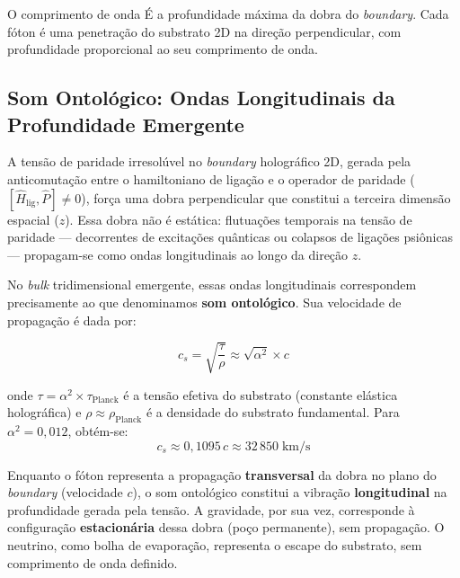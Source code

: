 \documentclass[12pt,a4paper,twoside]{article}
\newcommand{\alphaii}{\alpha^{2}}
\newcommand{\boundary}{\textit{boundary}}
\newcommand{\bulk}{\textit{bulk}}
\begin{document}
\noindent O comprimento de onda \'E a profundidade m\'axima da dobra do \boundary. Cada f\'oton \'e uma penetra\c{c}\~ao do substrato 2D na dire\c{c}\~ao perpendicular, com profundidade proporcional ao seu comprimento de onda.

\subsection{Som Ontol\'ogico: Ondas Longitudinais da Profundidade Emergente}

A tens\~ao de paridade irresol\'uvel no \boundary{} hologr\'afico 2D, gerada pela anticomuta\c{c}\~ao entre o hamiltoniano de liga\c{c}\~ao e o operador de paridade ($[\hat{H}_{\text{lig}}, \hat{P}] \neq 0$), for\c{c}a uma dobra perpendicular que constitui a terceira dimens\~ao espacial ($z$). Essa dobra n\~ao \'e est\'atica: flutua\c{c}\~oes temporais na tens\~ao de paridade --- decorrentes de excita\c{c}\~oes qu\^anticas ou colapsos de liga\c{c}\~oes psi\^onicas --- propagam-se como ondas longitudinais ao longo da dire\c{c}\~ao $z$.

No \bulk{} tridimensional emergente, essas ondas longitudinais correspondem precisamente ao que denominamos \textbf{som ontol\'ogico}. Sua velocidade de propaga\c{c}\~ao \'e dada por:
\begin{equationbox}[title={Velocidade do Som Ontol\'ogico}]
\begin{equation}
c_s = \sqrt{\frac{\tau}{\rho}} \approx \sqrt{\alphaii}\times c
\label{eq:som_ontologico}
\end{equation}
\end{equationbox}

\noindent onde $\tau = \alphaii \times \tau_{\text{Planck}}$ \'e a tens\~ao efetiva do substrato (constante el\'astica hologr\'afica) e $\rho \approx \rho_{\text{Planck}}$ \'e a densidade do substrato fundamental. Para $\alphaii = 0{,}012$, obt\'em-se:
\begin{equation}
c_s \approx 0{,}1095\,c \approx 32\,850\;\text{km/s}
\label{eq:cs_numerico}
\end{equation}

Enquanto o f\'oton representa a propaga\c{c}\~ao \textbf{transversal} da dobra no plano do \boundary{} (velocidade $c$), o som ontol\'ogico constitui a vibra\c{c}\~ao \textbf{longitudinal} na profundidade gerada pela tens\~ao. A gravidade, por sua vez, corresponde \`a configura\c{c}\~ao \textbf{estacion\'aria} dessa dobra (po\c{c}o permanente), sem propaga\c{c}\~ao. O neutrino, como bolha de evapora\c{c}\~ao, representa o escape do substrato, sem comprimento de onda definido.
\end{document}
